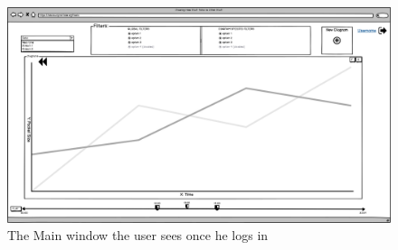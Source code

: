 \documentclass[twoside, english, draft]{Pflichtenheft}
\begin{document}
\begin{figure}[ht]
\centering
\includegraphics[width=\textwidth]{Images/02MW.png}
	\caption{The Main window the user sees once he logs in}
	\label{fig:mainWindow0}
\end{figure}
\vfill
\clearpage
\end{document}
